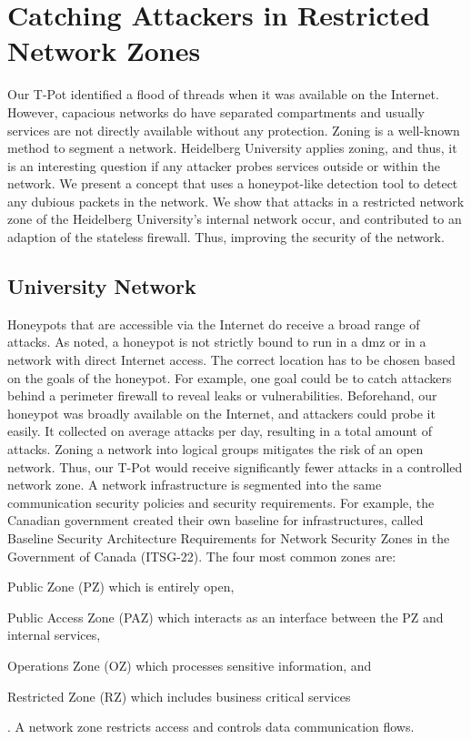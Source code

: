 \chapter{Catching Attackers in Restricted Network Zones}
\label{chap:concept}

Our T-Pot identified a flood of threads when it was available on the Internet.
However, capacious networks do have separated compartments and usually services are not directly available without any protection.
Zoning is a well-known method to segment a network.
Heidelberg University applies zoning, and thus, it is an interesting question if any attacker probes services outside or within the network.
We present a concept that uses a honeypot-like detection tool to detect any dubious packets in the network.
We show that attacks in a restricted network zone of the Heidelberg University's internal network occur, and contributed to an adaption of the stateless firewall.
Thus, improving the security of the network.

\section{University Network}

Honeypots that are accessible via the Internet do receive a broad range of attacks.
As \citet{Spitzner2003} noted, a honeypot is not strictly bound to run in a \ac{dmz} or in a network with direct Internet access.
The correct location has to be chosen based on the goals of the honeypot.
For example, one goal could be to catch attackers behind a perimeter firewall to reveal leaks or vulnerabilities.
Beforehand, our honeypot was broadly available on the Internet, and attackers could probe it easily.
It collected on average  attacks per day, resulting in a total amount of  attacks.
Zoning a network into logical groups mitigates the risk of an open network.
Thus, our T-Pot would receive significantly fewer attacks in a controlled network zone.
A network infrastructure is segmented into the same communication security policies and security requirements.
For example, the Canadian government created their own baseline for infrastructures, called Baseline Security Architecture Requirements for Network Security Zones in the Government of Canada (ITSG-22).
The four most common zones are:
\begin{enumerate*}[label=(\roman*)]
    \item Public Zone (PZ) which is entirely open,
    \item Public Access Zone (PAZ) which interacts as an interface between the PZ and internal services,
    \item Operations Zone (OZ) which processes sensitive information, and
    \item Restricted Zone (RZ) which includes business critical services
\end{enumerate*}.
A network zone restricts access and controls data communication flows. \cite{csec2021}

